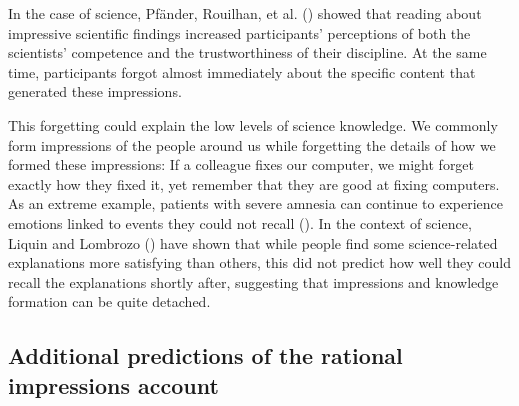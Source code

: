 \documentclass[
  jou,
  floatsintext,
  longtable,
  nolmodern,
  notxfonts,
  notimes,
  colorlinks=true,linkcolor=blue,citecolor=blue,urlcolor=blue]{apa7}
\begin{document}
In the case of science, Pfänder, Rouilhan, et al.
() showed
that reading about impressive scientific findings increased
participants' perceptions of both the scientists' competence and the
trustworthiness of their discipline. At the same time, participants
forgot almost immediately about the specific content that generated
these impressions.

This forgetting could explain the low levels of science knowledge. We
commonly form impressions of the people around us while forgetting the
details of how we formed these impressions: If a colleague fixes our
computer, we might forget exactly how they fixed it, yet remember that
they are good at fixing computers. As an extreme example, patients with
severe amnesia can continue to experience emotions linked to events they
could not recall
(). In the context of science, Liquin and Lombrozo
() have shown that
while people find some science-related explanations more satisfying than
others, this did not predict how well they could recall the explanations
shortly after, suggesting that impressions and knowledge formation can
be quite detached.

\subsection{Additional predictions of the rational impressions
account}\label{additional-predictions-of-the-rational-impressions-account}
\end{document}

